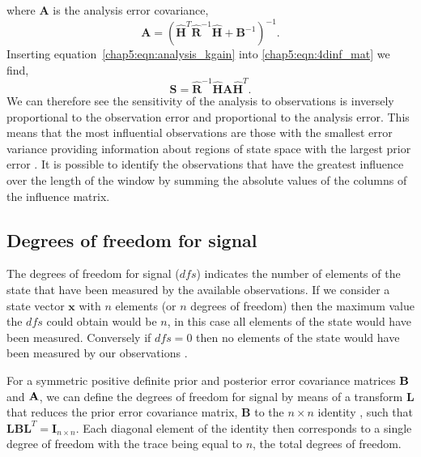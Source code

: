 where $\textbf{A}$ is the analysis error covariance,
\begin{equation}
\textbf{A} = (\hat{\textbf{H}}^{T}\hat{\textbf{R}}^{-1}\hat{\textbf{H}} + \textbf{B}^{-1})^{-1}.
\end{equation}
Inserting equation~\eqref{chap5:eqn:analysis_kgain} into \eqref{chap5:eqn:4dinf_mat} we find,
 \begin{equation}
 \textbf{S} = \hat{\textbf{R}}^{-1}\hat{\textbf{H}}\textbf{A}\hat{\textbf{H}}^{T}.
 \end{equation}
We can therefore see the sensitivity of the analysis to observations is inversely proportional to the observation error and proportional to the analysis error. This means that the most influential observations are those with the smallest error variance providing information about regions of state space with the largest prior error \citep{Cardinali2004}. It is possible to identify the observations that have the greatest influence over the length of the window by summing the absolute values of the columns of the influence matrix.

\subsection{Degrees of freedom for signal} \label{chap5:DFSintro}%

The degrees of freedom for signal ($dfs$) indicates the number of elements of the state that have been measured by the available observations. If we consider a state vector $\textbf{x}$ with $n$ elements (or $n$ degrees of freedom) then the maximum value the $dfs$ could obtain would be $n$, in this case all elements of the state would have been measured. Conversely if $dfs = 0$ then no elements of the state would have been measured by our observations \citep{Fowler2013}.

For a symmetric positive definite prior and posterior error covariance matrices $\bf{B}$ and $\bf{A}$, we can define the degrees of freedom for signal by means of a transform $\textbf{L}$ that reduces the prior error covariance matrix, $\textbf{B}$ to the $n \times n$ identity \citep{fisher2003estimation}, such that \(\textbf{L}\textbf{B}\textbf{L}^{T} = \textbf{I}_{n \times n}\). Each diagonal element of the identity then corresponds to a single degree of freedom with the trace being equal to $n$, the total degrees of freedom. 

